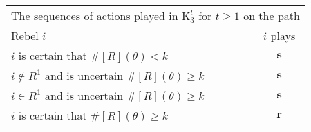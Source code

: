 \documentclass[12pt,letter]{article}
\newcommand{\Kappa}{\mathrm{K}}
\theoremstyle{definition}
\theoremstyle{remark}
\theoremstyle{claim}
\begin{document}
\begin{table}[!htbp]
\begin{center}
\begin{tabular}{l c}
\multicolumn{2}{c}{The sequences of actions played in $\Kappa^t_{3}$ for $t\geq 1$ on the path}\\
Rebel $i$ 	 	&  	$i$ plays		 \\
\hline
\hline
$i$ is certain that $\#[R](\theta)<k$ 	& 	$\textbf{s}$	\\
$i\notin R^{1}$ and is uncertain $\#[R](\theta)\geq k$	& 	$ \textbf{s} $	\\
$i\in R^{1}$ and is uncertain $\#[R](\theta)\geq k$ &  $ \textbf{s} $  \\
$i$ is certain that $\#[R](\theta)\geq k$ &  $ \textbf{r} $  \\
\hline
\end{tabular}
\end{center}
\end{table}




\end{document}
